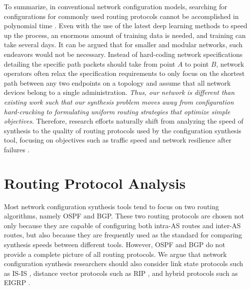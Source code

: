 \documentclass{uiucthesis2021}
\begin{document}
\noindent To summarize, in conventional network configuration models, searching for configurations for commonly used routing protocols cannot be accomplished in polynomial time \cite{9940325}. Even with the use of the latest deep learning methods to speed up the process, an enormous amount of training data is needed, and training can take several days. It can be argued that for smaller and modular networks, such endeavors would not be necessary. Instead of hard-coding network specifications detailing the specific path packets should take from point $A$ to point $B$, network operators often relax the specification requirements to only focus on the shortest path between any two endpoints on a topology and assume that all network devices belong to a single administration. \textit{Thus, our network is different than existing work such that our synthesis problem moves away from configuration hard-cracking to formulating uniform routing strategies that optimize simple objectives.} Therefore, research efforts naturally shift from analyzing the speed of synthesis to the quality of routing protocols used by the configuration synthesis tool, focusing on objectives such as traffic speed and network resilience after failures \cite{9358327}.

\section{Routing Protocol Analysis}
\noindent Most network configuration synthesis tools \cite{beurerkellner2022learning,9940325, 10.1145/3405671.3405816,10.1145/3062341.3062367,10.5555/3307441.3307491} tend to focus on two routing algorithms, namely OSPF and BGP. These two routing protocols are chosen not only because they are capable of configuring both intra-AS routes and inter-AS routes, but also because they are frequently used as the standard for comparing synthesis speeds between different tools. However, OSPF and BGP do not provide a complete picture of all routing protocols. We argue that network configuration synthesis researchers should also consider link state protocols such as IS-IS \cite{oran1990osi}, distance vector protocols such as RIP \cite{malkin1998rip}, and hybrid protocols such as EIGRP \cite{eigrp}. \\
\end{document}

